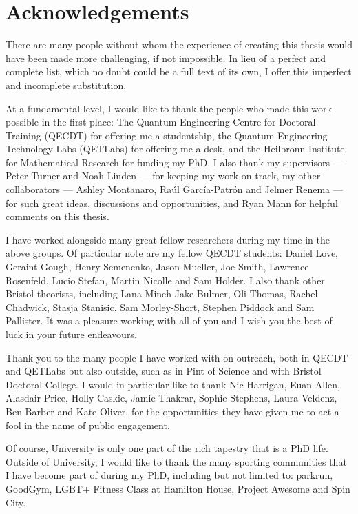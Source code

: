 \chapter*{Acknowledgements}

There are many people without whom the experience of creating this thesis would have been made more challenging, if not impossible. In lieu of a perfect and complete list, which no doubt could be a full text of its own, I offer this imperfect and incomplete substitution.

At a fundamental level, I would like to thank the people who made this work possible in the first place: The Quantum Engineering Centre for Doctoral Training (QECDT) for offering me a studentship, the Quantum Engineering Technology Labs (QETLabs) for offering me a desk, and the Heilbronn Institute for Mathematical Research for funding my PhD. I also thank my supervisors --- Peter Turner and Noah Linden --- for keeping my work on track, my other collaborators --- Ashley Montanaro, Ra\'{u}l Garc\'{i}a-Patr\'{o}n and Jelmer Renema --- for such great ideas, discussions and opportunities, and Ryan Mann for helpful comments on this thesis.

I have worked alongside many great fellow researchers during my time in the above groups. Of particular note are my fellow QECDT students: Daniel Love, Geraint Gough, Henry Semenenko, Jason Mueller, Joe Smith, Lawrence Rosenfeld, Lucio Stefan, Martin Nicolle and Sam Holder. I also thank other Bristol theorists, including Lana Mineh Jake Bulmer, Oli Thomas, Rachel Chadwick, Stasja Stanisic, Sam Morley-Short, Stephen Piddock and Sam Pallister. It was a pleasure working with all of you and I wish you the best of luck in your future endeavours.

Thank you to the many people I have worked with on outreach, both in QECDT and QETLabs but also outside, such as in Pint of Science and with Bristol Doctoral College. I would in particular like to thank Nic Harrigan, Euan Allen, Alasdair Price, Holly Caskie, Jamie Thakrar, Sophie Stephens, Laura Veldenz, Ben Barber and Kate Oliver, for the opportunities they have given me to act a fool in the name of public engagement.

Of course, University is only one part of the rich tapestry that is a PhD life. Outside of University, I would like to thank the many sporting communities that I have become part of during my PhD, including but not limited to: parkrun, GoodGym, LGBT+ Fitness Class at Hamilton House, Project Awesome and Spin City.

